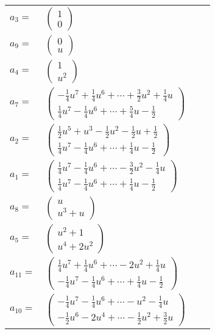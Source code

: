 \documentclass[1p]{elsarticle_modified}
\theoremstyle{definition}
\begin{document}
\begin{tabular}{m{7pt} m{180pt} m{7pt} m{180pt} }
\flushright $a_{3}=$&$\begin{pmatrix}1\\0\end{pmatrix}$ \\
\flushright $a_{9}=$&$\begin{pmatrix}0\\u\end{pmatrix}$ \\
\flushright $a_{4}=$&$\begin{pmatrix}1\\u^2\end{pmatrix}$ \\
\flushright $a_{7}=$&$\begin{pmatrix}-\frac{1}{4} u^7+\frac{1}{4} u^6+\cdots+\frac{3}{2} u^2+\frac{1}{4} u\\\frac{1}{4} u^7-\frac{1}{4} u^6+\cdots+\frac{5}{4} u-\frac{1}{2}\end{pmatrix}$ \\
\flushright $a_{2}=$&$\begin{pmatrix}\frac{1}{2} u^5+u^3-\frac{1}{2} u^2-\frac{1}{2} u+\frac{1}{2}\\\frac{1}{4} u^7-\frac{1}{4} u^6+\cdots+\frac{1}{4} u-\frac{1}{2}\end{pmatrix}$ \\
\flushright $a_{1}=$&$\begin{pmatrix}\frac{1}{4} u^7-\frac{1}{4} u^6+\cdots-\frac{3}{2} u^2-\frac{1}{4} u\\\frac{1}{4} u^7-\frac{1}{4} u^6+\cdots+\frac{1}{4} u-\frac{1}{2}\end{pmatrix}$ \\
\flushright $a_{8}=$&$\begin{pmatrix}u\\u^3+u\end{pmatrix}$ \\
\flushright $a_{5}=$&$\begin{pmatrix}u^2+1\\u^4+2 u^2\end{pmatrix}$ \\
\flushright $a_{11}=$&$\begin{pmatrix}\frac{1}{4} u^7+\frac{1}{4} u^6+\cdots-2 u^2+\frac{1}{4} u\\-\frac{1}{4} u^7-\frac{1}{4} u^6+\cdots+\frac{1}{4} u-\frac{1}{2}\end{pmatrix}$ \\
\flushright $a_{10}=$&$\begin{pmatrix}-\frac{1}{4} u^7-\frac{1}{4} u^6+\cdots- u^2-\frac{1}{4} u\\-\frac{1}{2} u^6-2 u^4+\cdots-\frac{1}{2} u^2+\frac{3}{2} u\end{pmatrix}$ \\

\end{tabular}
\end{document}
